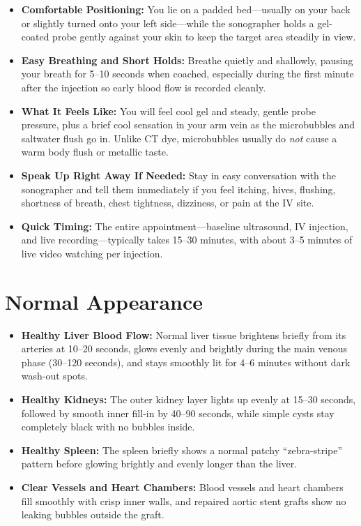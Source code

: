 \begin{itemize}
    \item \textbf{Comfortable Positioning:} You lie on a padded bed---usually on your back or slightly turned onto your left side---while the sonographer holds a gel-coated probe gently against your skin to keep the target area steadily in view.
    \item \textbf{Easy Breathing and Short Holds:} Breathe quietly and shallowly, pausing your breath for 5--10 seconds when coached, especially during the first minute after the injection so early blood flow is recorded cleanly.
    \item \textbf{What It Feels Like:} You will feel cool gel and steady, gentle probe pressure, plus a brief cool sensation in your arm vein as the microbubbles and saltwater flush go in. Unlike CT dye, microbubbles usually do \emph{not} cause a warm body flush or metallic taste.
    \item \textbf{Speak Up Right Away If Needed:} Stay in easy conversation with the sonographer and tell them immediately if you feel itching, hives, flushing, shortness of breath, chest tightness, dizziness, or pain at the IV site.
    \item \textbf{Quick Timing:} The entire appointment---baseline ultrasound, IV injection, and live recording---typically takes 15--30 minutes, with about 3--5 minutes of live video watching per injection.
\end{itemize}

\section{Normal Appearance}

\begin{itemize}
    \item \textbf{Healthy Liver Blood Flow:} Normal liver tissue brightens briefly from its arteries at 10--20 seconds, glows evenly and brightly during the main venous phase (30--120 seconds), and stays smoothly lit for 4--6 minutes without dark wash-out spots.
    \item \textbf{Healthy Kidneys:} The outer kidney layer lights up evenly at 15--30 seconds, followed by smooth inner fill-in by 40--90 seconds, while simple cysts stay completely black with no bubbles inside.
    \item \textbf{Healthy Spleen:} The spleen briefly shows a normal patchy ``zebra-stripe'' pattern before glowing brightly and evenly longer than the liver.
    \item \textbf{Clear Vessels and Heart Chambers:} Blood vessels and heart chambers fill smoothly with crisp inner walls, and repaired aortic stent grafts show no leaking bubbles outside the graft.
\end{itemize}

